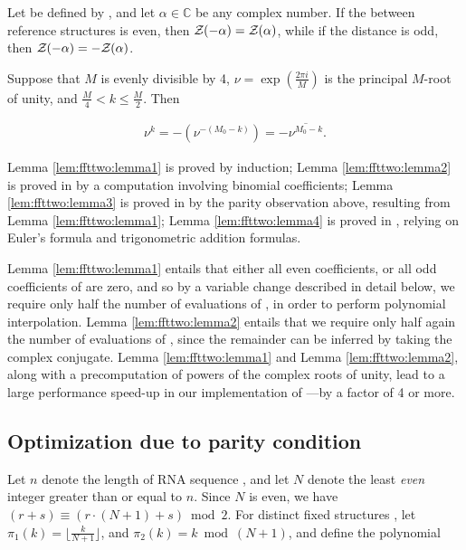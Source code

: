 \begin{lemma}
\label{lem:ffttwo:lemma3}
Let \fullZx be defined by , and
let $\alpha \in \mathbb{C}$ be any complex number.
If the \bpd between reference
structures \strAB is even, then ${\mathcal Z}_{}(-\alpha) = {\mathcal Z}_{}(\alpha)$,
while if
the distance is odd, then ${\mathcal Z}_{}(-\alpha) = -{\mathcal Z}_{}(\alpha)$.
\end{lemma}

\begin{lemma}
\label{lem:ffttwo:lemma4}
Suppose that $M$ is evenly divisible by 4,
$\nu = \exp(\frac{2 \pi i}{M})$ is the principal $M$-root of unity, and
$\frac{M}{4} < k \leq \frac{M}{2}$. Then

\begin{align}
\nu^k = -(\nu^{-(M_0-k)}) = -\overline{\nu^{M_0-k}}.
\end{align}
\end{lemma}

Lemma \ref{lem:ffttwo:lemma1} is proved by induction;
Lemma \ref{lem:ffttwo:lemma2}
is proved in  by a computation involving
binomial coefficients;
Lemma \ref{lem:ffttwo:lemma3} is proved in 
by the parity observation above, resulting from Lemma \ref{lem:ffttwo:lemma1};
Lemma \ref{lem:ffttwo:lemma4} is proved in ,
relying on Euler's formula and trigonometric addition formulas.

Lemma \ref{lem:ffttwo:lemma1}
entails that either all even coefficients, or all odd coefficients
of \fullZx are zero, and so by a variable change described in detail below,
we require only half the number of evaluations of \fullZx, in order to perform
polynomial interpolation.
Lemma \ref{lem:ffttwo:lemma2}
entails that we require only half again the number of evaluations of
\fullZx, since the remainder can be inferred by taking the complex conjugate.
Lemma \ref{lem:ffttwo:lemma1} and Lemma \ref{lem:ffttwo:lemma2},
along with a
precomputation of powers of the complex roots of unity, lead to a
large performance speed-up in our implementation of \ffttwo---by a factor
of 4 or more.

\subsection{Optimization due to parity condition}
\label{subsec:ffttwo:parity}

Let $n$ denote the length of RNA sequence \seq, and let $N$ denote the
least {\em even} integer greater than or equal to $n$. Since $N$ is even,
we have $(r+s) \equiv (r\cdot(N+1)+s) \bmod 2$. For distinct
fixed structures \strAB, let
$\pi_1(k) = \lfloor \frac{k}{N+1} \rfloor$, and
$\pi_2(k) = k \bmod (N+1)$, and define the polynomial

